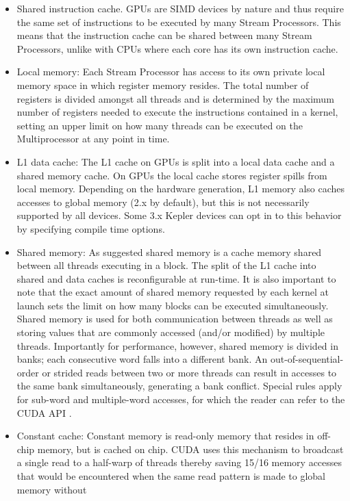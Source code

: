 \begin{itemize}
 \item Shared instruction cache. GPUs are SIMD devices by nature and thus require the same set of instructions to be executed
 by many Stream Processors. This means that the instruction cache can be shared between many Stream Processors, unlike with CPUs
 where each core has its own instruction cache.
 \item Local memory: Each Stream Processor has access to its own private local memory space in which register memory resides. The total number of
 registers is divided amongst all threads and is determined by the maximum number of registers needed to execute the instructions contained in a 
 kernel, setting an upper limit on how many threads can be executed on the Multiprocessor at any point in time. 
 \item L1 data cache: The L1 cache on GPUs is split into a local data cache and a shared memory cache. On GPUs the local cache stores register 
 spills from local memory. Depending on the hardware generation, L1 memory also caches accesses to global memory (2.x by default), but this is
 not necessarily supported by all devices. Some 3.x Kepler devices can opt in to this behavior by specifying compile time options.
 \item Shared memory: As suggested shared memory is a cache memory shared between all threads executing in a block. The split of the L1 cache into
 shared and data caches is reconfigurable at run-time. It is also important to note that the exact amount of shared memory requested by each kernel at 
 launch sets the limit on how many blocks can be executed simultaneously. Shared memory is used for both communication between threads as well
 as storing values that are commonly accessed (and/or modified) by multiple threads. Importantly for performance, however, shared memory is divided 
 in banks; each consecutive word falls into a different bank. An out-of-sequential-order or strided reads between two or more threads
 can result in accesses to the same bank simultaneously, generating a bank conflict. Special rules apply for sub-word and multiple-word accesses, for
 which the reader can refer to the CUDA API \cite[Section G: Compute Capabilities]{cuda}.
 \item Constant cache: Constant memory is read-only memory that resides in off-chip memory, but is cached on chip. CUDA uses this mechanism to broadcast
 a single read to a half-warp of threads thereby saving 15/16 memory accesses that would be encountered when the same read pattern is made to global memory without 

\end{itemize}
